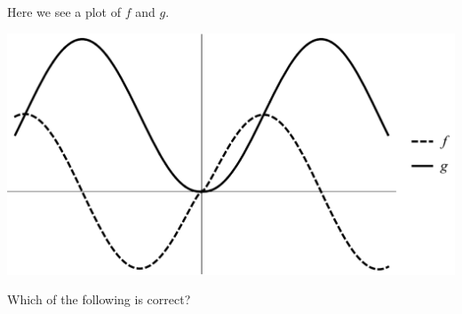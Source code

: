 \documentclass{ximera}
\author{Bart Snapp}
\begin{document}
\begin{exercise}
Here we see a plot of $f$ and $g$. 
\begin{image}
\includegraphics[width=.5\textwidth]{graphFandG10.png}
\end{image}
Which of the following is correct?
\begin{multipleChoice}
\end{multipleChoice}
\end{exercise}
\end{document}
